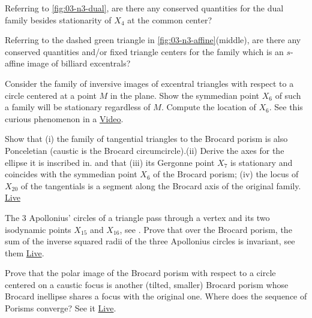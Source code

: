 \begin{question}
Referring to \cref{fig:03-n3-dual}, are there any conserved quantities for the dual family besides stationarity of $X_4$ at the common center?
\end{question}

\begin{question}
Referring to  the dashed green triangle in \cref{fig:03-n3-affine}(middle), are there any conserved quantities and/or fixed triangle centers for the family which is an $s$-affine image of billiard excentrals?
\end{question}

\begin{question}
Consider the family of inversive images of excentral triangles with respect to a circle centered at a point $M$ in the plane. Show the symmedian point $X_6$ of such a family will be stationary regardless of $M$. Compute the location of $X_6$. See this curious phenomenon in a \href{https://youtu.be/wwX_QfkjVi0}{Video}.
\end{question}

\begin{question}
Show that (i) the family of tangential triangles to the Brocard porism is also Ponceletian (caustic is the Brocard circumcircle).(ii) Derive the axes for the ellipse it is inscribed in.  and that (iii) its Gergonne point $X_7$ is stationary and coincides with the symmedian point $X_6$ of the Brocard porism; (iv) the locus of $X_{20}$ of the tangentials is a segment along the Brocard axis of the original family. \href{https://bit.ly/2RpNxdn}{Live} 
\end{question}

\begin{question}
The 3 Apollonius' circles of a triangle pass through a vertex and its two isodynamic points $X_{15}$ and $X_{16}$, see \cite[Isodynamic points]{mw}. Prove that over the Brocard porism, the sum of the inverse squared radii of the three Apollonius circles is invariant, see them \href{https://bit.ly/3elEzXI}{Live}.
\end{question}

\begin{question}
Prove that the polar image of the Brocard porism with respect to a circle centered on a caustic focus is another (tilted, smaller) Brocard porism whose Brocard inellipse shares a focus with the original one. Where does the sequence of Porisms converge? See it \href{https://bit.ly/3b7erOg}{Live}.
\end{question}


